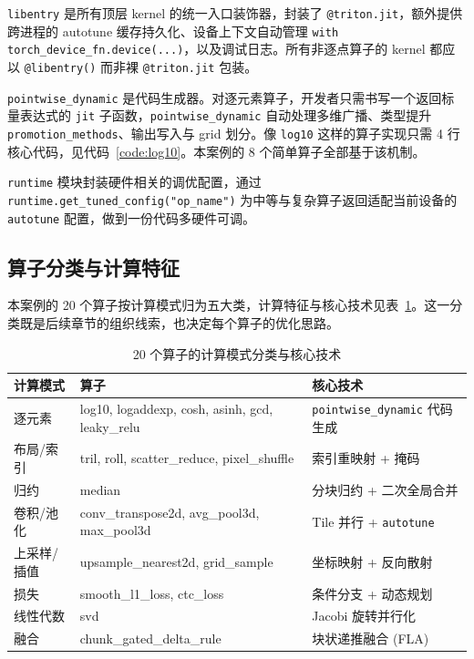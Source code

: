 \texttt{libentry} 是所有顶层 kernel 的统一入口装饰器，封装了 \texttt{@triton.jit}，额外提供跨进程的 autotune 缓存持久化、设备上下文自动管理 \texttt{with torch\_device\_fn.device(...)}，以及调试日志。所有非逐点算子的 kernel 都应以 \texttt{@libentry()} 而非裸 \texttt{@triton.jit} 包装。

\texttt{pointwise\_dynamic} 是代码生成器。对逐元素算子，开发者只需书写一个返回标量表达式的 \texttt{jit} 子函数，\texttt{pointwise\_dynamic} 自动处理多维广播、类型提升 \texttt{promotion\_methods}、输出写入与 grid 划分。像 \texttt{log10} 这样的算子实现只需 4 行核心代码，见代码~\ref{code:log10}。本案例的 8 个简单算子全部基于该机制。

\texttt{runtime} 模块封装硬件相关的调优配置，通过 \texttt{runtime.get\_tuned\_config("op\_name")} 为中等与复杂算子返回适配当前设备的 \texttt{autotune} 配置，做到一份代码多硬件可调。

\subsection{算子分类与计算特征}
本案例的 20 个算子按计算模式归为五大类，计算特征与核心技术见表~\ref{tab:op-class}。这一分类既是后续章节的组织线索，也决定每个算子的优化思路。

\begin{table}[!htbp]
\centering\small
\caption{20 个算子的计算模式分类与核心技术}
\label{tab:op-class}
\renewcommand{\arraystretch}{1.12}
\begin{tabularx}{\textwidth}{lXX}
\toprule
计算模式 & 算子 & 核心技术 \\
\midrule
逐元素 & log10, logaddexp, cosh, asinh, gcd, leaky\_relu & \texttt{pointwise\_dynamic} 代码生成 \\
布局/索引 & tril, roll, scatter\_reduce, pixel\_shuffle & 索引重映射 + 掩码 \\
归约 & median & 分块归约 + 二次全局合并 \\
卷积/池化 & conv\_transpose2d, avg\_pool3d, max\_pool3d & Tile 并行 + \texttt{autotune} \\
上采样/插值 & upsample\_nearest2d, grid\_sample & 坐标映射 + 反向散射 \\
损失 & smooth\_l1\_loss, ctc\_loss & 条件分支 + 动态规划 \\
线性代数 & svd & Jacobi 旋转并行化 \\
融合 & chunk\_gated\_delta\_rule & 块状递推融合 (FLA) \\
\bottomrule
\end{tabularx}
\end{table}

